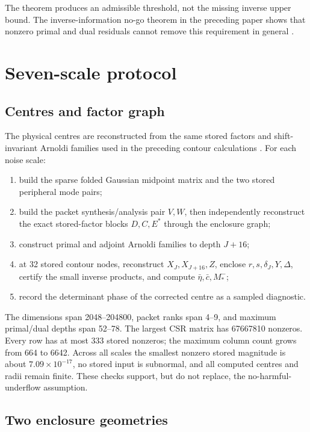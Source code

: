 \documentclass[11pt]{article}
\theoremstyle{definition}
\theoremstyle{remark}
\begin{document}
The theorem produces an admissible threshold, not the missing inverse upper
bound.  The inverse-information no-go theorem in the preceding paper shows
that nonzero primal and dual residuals cannot remove this requirement in
general \citep{WangPrimalDual2026}.

\section{Seven-scale protocol}
\label{sec:protocol}

\subsection{Centres and factor graph}

The physical centres are reconstructed from the same stored factors and
shift-invariant Arnoldi families used in the preceding contour calculations
\citep{WangContourFeshbach2026,WangDirectionalRouche2026}.  For each noise
scale:

\begin{enumerate}
 \item build the sparse folded Gaussian midpoint matrix and the two stored
 peripheral mode pairs;
 \item build the packet synthesis/analysis pair \(V,W\), then independently
 reconstruct the exact stored-factor blocks \(D,C,E^*\) through the
 enclosure graph;
 \item construct primal and adjoint Arnoldi families to depth \(J+16\);
 \item at 32 stored contour nodes, reconstruct \(X_J,X_{J+16},Z\), enclose
 \(r,s,\delta_J,Y,\Delta\), certify the small inverse products, and compute
 \(\bar\eta,\bar c,M_*^-\);
 \item record the determinant phase of the corrected centre as a sampled
 diagnostic.
\end{enumerate}

The dimensions span 2048--204800, packet ranks span 4--9, and maximum
primal/dual depths span 52--78.  The largest CSR matrix has
67667810 nonzeros.  Every row has at most 333 stored nonzeros; the maximum
column count grows from 664 to 6642.  Across all scales the smallest nonzero
stored magnitude is about \(7.09\times10^{-17}\), no stored input is
subnormal, and all computed centres and radii remain finite.  These checks
support, but do not replace, the no-harmful-underflow assumption.

\subsection{Two enclosure geometries}
\end{document}
